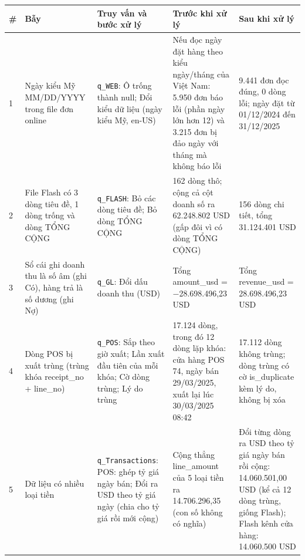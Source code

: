 {\small
\begin{longtable}{@{}p{0.4cm} p{2.6cm} p{3.4cm} p{4.2cm} p{4.2cm}@{}}
\toprule
\# & Bẫy & Truy vấn và bước xử lý & Trước khi xử lý & Sau khi xử lý \\
\midrule
\endhead
1 & Ngày kiểu Mỹ MM/DD/YYYY trong file đơn online & \texttt{q\_WEB}: Ô trống thành null; Đổi kiểu dữ liệu (ngày kiểu Mỹ, en-US) & Nếu đọc ngày đặt hàng theo kiểu ngày/tháng của Việt Nam: 5.950 đơn báo lỗi (phần ngày lớn hơn 12) và 3.215 đơn bị đảo ngày với tháng mà không báo lỗi & 9.441 đơn đọc đúng, 0 dòng lỗi; ngày đặt từ 01/12/2024 đến 31/12/2025 \\ \midrule
2 & File Flash có 3 dòng tiêu đề, 1 dòng trống và dòng TỔNG CỘNG & \texttt{q\_FLASH}: Bỏ các dòng tiêu đề; Bỏ dòng TỔNG CỘNG & 162 dòng thô; cộng cả cột doanh số ra 62.248.802 USD (gấp đôi vì có dòng TỔNG CỘNG) & 156 dòng chi tiết, tổng 31.124.401 USD \\ \midrule
3 & Sổ cái ghi doanh thu là số âm (ghi Có), hàng trả là số dương (ghi Nợ) & \texttt{q\_GL}: Đổi dấu doanh thu (USD) & Tổng amount\_usd = $-$28.698.496,23 USD & Tổng revenue\_usd = 28.698.496,23 USD \\ \midrule
4 & Dòng POS bị xuất trùng (trùng khóa receipt\_no + line\_no) & \texttt{q\_POS}: Sắp theo giờ xuất; Lần xuất đầu tiên của mỗi khóa; Cờ dòng trùng; Lý do trùng & 17.124 dòng, trong đó 12 dòng lặp khóa: cửa hàng POS 74, ngày bán 29/03/2025, xuất lại lúc 30/03/2025 08:42 & 17.112 dòng không trùng; dòng trùng có cờ is\_duplicate kèm lý do, không bị xóa \\ \midrule
5 & Dữ liệu có nhiều loại tiền & \texttt{q\_Transactions}: POS: ghép tỷ giá ngày bán; Đổi ra USD theo tỷ giá ngày (chia cho tỷ giá rồi mới cộng) & Cộng thẳng line\_amount của 5 loại tiền ra 14.706.296,35 (con số không có nghĩa) & Đổi từng dòng ra USD theo tỷ giá ngày bán rồi cộng: 14.060.501,00 USD (kể cả 12 dòng trùng, giống Flash); Flash kênh cửa hàng: 14.060.500 USD \\ \midrule
\end{longtable}}
